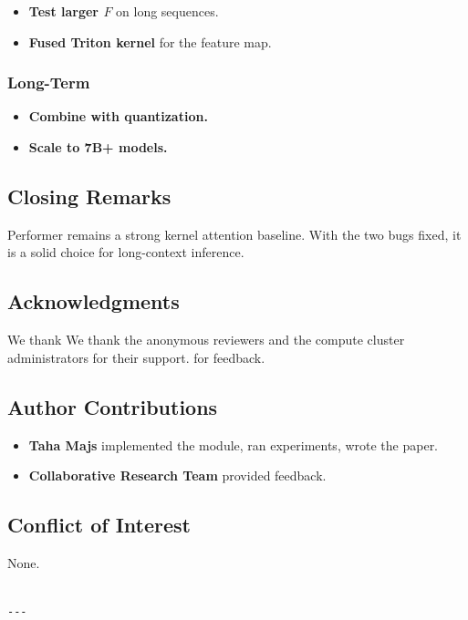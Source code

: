 \begin{itemize}
\item \textbf{Test larger $F$} on long sequences.
\item \textbf{Fused Triton kernel} for the feature map.

\end{itemize}
\subsubsection{Long-Term}

\begin{itemize}
\item \textbf{Combine with quantization.}
\item \textbf{Scale to 7B+ models.}

\end{itemize}
\subsection{Closing Remarks}

Performer remains a strong kernel attention baseline. With the two bugs 
fixed, it is a solid choice for long-context inference.

\subsection{Acknowledgments}

We thank We thank the anonymous reviewers and the compute cluster administrators for their support. for feedback.

\subsection{Author Contributions}

\begin{itemize}
\item \textbf{Taha Majs} implemented the module, ran experiments, wrote the paper.
\item \textbf{Collaborative Research Team} provided feedback.

\end{itemize}
\subsection{Conflict of Interest}

None.
\begin{lstlisting}

---
\end{lstlisting}


